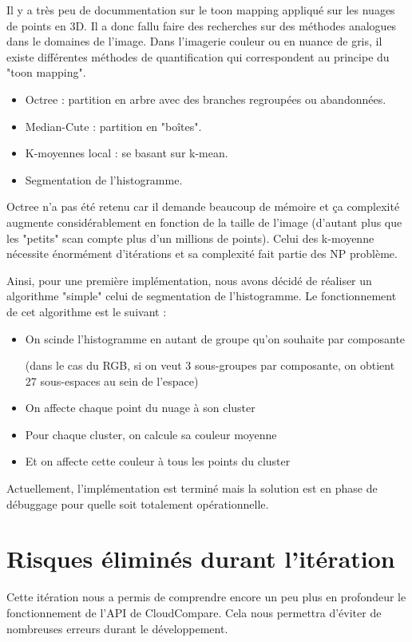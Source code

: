 \documentclass[12pt,titlepage,french]{article}
\begin{document}
Il y a très peu de docummentation sur le toon mapping appliqué sur les nuages de points en 3D. 
Il a donc fallu faire des recherches sur des méthodes analogues dans le domaines de l'image. 
Dans l'imagerie couleur ou en nuance de gris, il existe différentes méthodes de quantification qui correspondent au principe du "toon mapping".
\newline
\begin{itemize}
    \item Octree : partition en arbre avec des branches regroupées ou abandonnées.
    \item Median-Cute : partition en "boîtes".
    \item K-moyennes local : se basant sur k-mean.
    \item Segmentation de l'histogramme.
\end{itemize}

Octree n'a pas été retenu car il demande beaucoup de mémoire et ça complexité augmente considérablement en fonction de la taille de l'image (d'autant plus que les "petits" scan compte plus d'un millions de points). Celui des k-moyenne nécessite énormément d'itérations et sa complexité fait partie des NP problème.

Ainsi, pour une première implémentation, nous avons décidé de réaliser un algorithme "simple" celui de segmentation de l'histogramme. Le fonctionnement de cet algorithme est le suivant :
\begin{itemize}
    \item On scinde l'histogramme en autant de groupe qu'on souhaite par composante
    
    (dans le cas du RGB, si on veut 3 sous-groupes par composante, on obtient 27 sous-espaces au sein de l'espace)
    \item On affecte chaque point du nuage à son cluster
    \item Pour chaque cluster, on calcule sa couleur moyenne
    \item Et on affecte cette couleur à tous les points du cluster
\end{itemize}

Actuellement, l'implémentation est terminé mais la solution est en phase de débuggage pour quelle soit totalement opérationnelle.
\section{Risques éliminés durant l'itération}
Cette itération nous a permis de comprendre encore un peu plus en profondeur le fonctionnement de l'API de CloudCompare.
Cela nous permettra d'éviter de nombreuses erreurs durant le développement.
\end{document}
